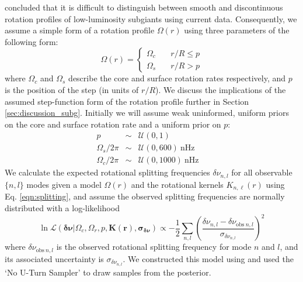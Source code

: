\citet{deheuvels_seismic_2014} concluded that it is difficult to distinguish between smooth and discontinuous rotation profiles of low-luminosity subgiants using current data.
Consequently, we assume a simple form of a rotation profile $\Omega(r)$ using three parameters of the following form:
\begin{equation}
\Omega(r) = \left\{
        \begin{array}{ll}
            \Omega_c & \quad r/R \leq p \\
            \Omega_s & \quad r/R > p
        \end{array}
    \right.
    \label{eqn:step}
\end{equation}
\noindent{}where $\Omega_c$ and $\Omega_s$ describe the core and surface rotation rates respectively, and $p$ is the position of the step (in units of $r/R$). We discuss the implications of the assumed step-function form of the rotation profile further in Section \ref{sec:discussion_subg}. Initially we will assume weak uninformed, uniform priors on the core and surface rotation rate and a uniform prior on $p$:
\begin{eqnarray}
    p &\sim& \mathcal{U}\left(0, 1\right) \\
    \Omega_s/2\pi &\sim& \mathcal{U}\left(0, 600\right) \ \mathrm{nHz} \\
    \Omega_c/2\pi &\sim& \mathcal{U}\left(0, 1000\right)\ \mathrm{nHz}\quad
\end{eqnarray}
We calculate the expected rotational splitting frequencies $\delta\nu_{n,l}$ for all observable $\{n,l\}$ modes given a model $\Omega(r)$ and the rotational kernels ${K}_{n,\ell}(r)$ using Eq. \ref{eqn:splitting}, and assume the observed splitting frequencies are normally distributed with a log-likelihood
\begin{equation}
    \ln \mathcal{L}( \pmb{ \delta\nu } | \Omega_c,\Omega_r,p, \mathbf{{K}(r)}, \pmb{ \sigma_{\delta\nu} } ) \propto -\frac{1}{2}\sum_{n,l}\left(\frac{\delta \nu_{n,l} - \delta \nu_{\mathrm{obs} \ n,l}}{\sigma_{\delta \nu_{n,l}}}\right)^2 
    \label{eqn:lnl}
\end{equation}
where $\delta\nu_{\mathrm{obs} \ n,l}$ is the observed rotational splitting frequency for mode $n$ and $l$, and its associated uncertainty is $\sigma_{\delta\nu_{n,l}}$.
We constructed this model using \pymc{} \citep{salvatier_probabilistic_2016} and used the `No U-Turn Sampler' \citep{hoffman_no-u-turn_2011} to draw samples from the posterior.

